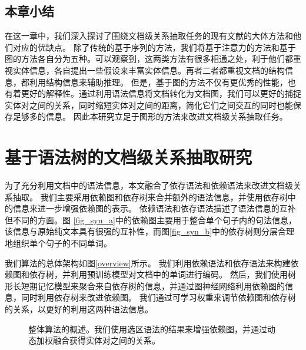 \documentclass[bachelor]{thesis-uestc}
\begin{document}
\section{本章小结}

在这一章中，我们深入探讨了围绕文档级关系抽取任务的现有文献的大体方法和他们对应的优缺点。
除了传统的基于序列的方法，我们将基于注意力的方法和基于图的方法各自分为五种。可以观察到，这两类方法有很多相通之处，利于他们都重视实体信息，各自提出一些假设来丰富实体信息。再者二者都重视文档的结构信息，都利用结构信息来辅助推理。
但是，基于图的方法不仅有更优秀的性能，也有着更好的解释性。通过利用语法信息将文档转化为文档图，我们可以更好的捕捉实体对之间的关系，同时缩短实体对之间的距离，简化它们之间交互的同时也能保存足够多的信息。
因此本研究立足于图形的方法来改进文档级关系抽取任务。


\chapter{基于语法树的文档级关系抽取研究}
为了充分利用文档中的语法信息，本文融合了依存语法和依赖语法来改进文档级关系抽取。
我们主要采用依赖图和依存树来合并额外的语法信息，并使用依存树中的信息来进一步增强依赖图的表示。
依赖语法和依存语法描述了语法信息的互补但不同的方面。图 \ref{fig_syn_a}中的依赖图主要用于整合单个句子内的句法信息，该信息与原始纯文本具有很强的互补性，而图\ref{fig_syn_b}中的依存树则分层合理地组织单个句子的不同单词。\par

我们算法的总体架构如图\ref{overview}所示。
我们利用依赖语法和依存语法来构建依赖图和依存树，并利用预训练模型对文档中的单词进行编码。
然后，我们使用树形长短期记忆模型来聚合来自依存树的信息，并通过图神经网络利用依赖图的信息，同时利用依存树来改进依赖图。
我们通过可学习权重来调节依赖图和依存树的关系，以更好的利用这两种语法信息。

\begin{figure}
    \caption{整体算法的概述。我们使用选区语法的结果来增强依赖图，并通过动态加权融合获得实体对之间的关系。}
\end{figure}\label{overview}
\end{document}
